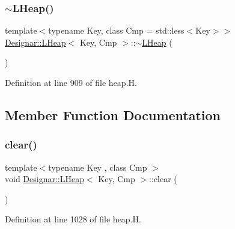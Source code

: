 \mbox{\label{class_designar_1_1_l_heap_ae8222af1e06c39acc9ae21589c70b874}} 
\subsubsection{\texorpdfstring{$\sim$\+L\+Heap()}{~LHeap()}}
{\footnotesize\ttfamily template$<$typename Key, class Cmp = std\+::less$<$\+Key$>$$>$ \\
\hyperlink{class_designar_1_1_l_heap}{Designar\+::\+L\+Heap}$<$ Key, Cmp $>$\+::$\sim$\hyperlink{class_designar_1_1_l_heap}{L\+Heap} (\begin{DoxyParamCaption}{ }\end{DoxyParamCaption})\hspace{0.3cm}{\ttfamily [inline]}}



Definition at line 909 of file heap.\+H.



\subsection{Member Function Documentation}
\mbox{\label{class_designar_1_1_l_heap_a19ea9506d108cdb3662f936e21483c1d}} 
\subsubsection{\texorpdfstring{clear()}{clear()}}
{\footnotesize\ttfamily template$<$typename Key , class Cmp $>$ \\
void \hyperlink{class_designar_1_1_l_heap}{Designar\+::\+L\+Heap}$<$ Key, Cmp $>$\+::clear (\begin{DoxyParamCaption}{ }\end{DoxyParamCaption})}



Definition at line 1028 of file heap.\+H.

\mbox{\label{class_designar_1_1_l_heap_ae8fe8b715ed64d66763a20e409b76bd3}} 

